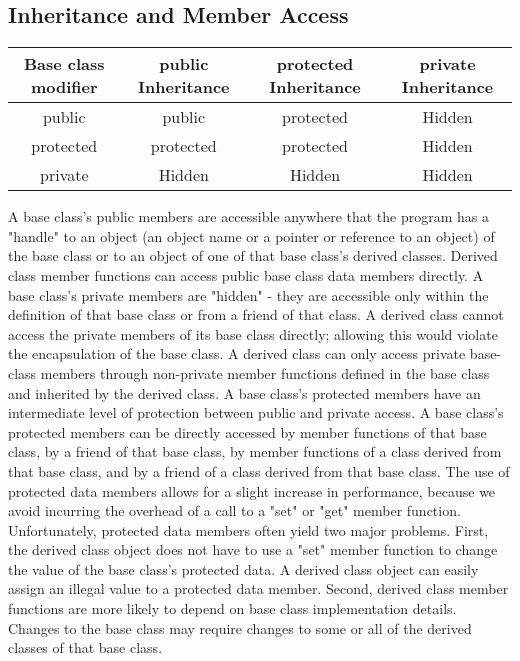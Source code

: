 \documentclass{report}
\begin{document}
    \subsection{Inheritance and Member Access}
    \bigbreak \noindent 
    \begin{center}
        \begin{tabular}{c|c|c|c}
            Base class modifier	& public Inheritance	& protected Inheritance	& private Inheritance \\
            \hline
            public	&public 	&protected 	&Hidden  \\
            protected &	protected 	&protected 	&Hidden  \\
            private	&Hidden 	&Hidden 	&Hidden 
        \end{tabular}

    \end{center}
    \bigbreak \noindent 
    A base class's public members are accessible anywhere that the program has a "handle" to an object (an object name or a pointer or reference to an object) of the base class or to an object of one of that base class's derived classes. Derived class member functions can access public base class data members directly.
    \bigbreak \noindent 
    A base class's private members are "hidden" - they are accessible only within the definition of that base class or from a friend of that class. A derived class cannot access the private members of its base class directly; allowing this would violate the encapsulation of the base class. A derived class can only access private base-class members through non-private member functions defined in the base class and inherited by the derived class.
    \bigbreak \noindent 
    A base class's protected members have an intermediate level of protection between public and private access. A base class's protected members can be directly accessed by member functions of that base class, by a friend of that base class, by member functions of a class derived from that base class, and by a friend of a class derived from that base class.
    \bigbreak \noindent 
    The use of protected data members allows for a slight increase in performance, because we avoid incurring the overhead of a call to a "set" or "get" member function. Unfortunately, protected data members often yield two major problems. First, the derived class object does not have to use a "set" member function to change the value of the base class's protected data. A derived class object can easily assign an illegal value to a protected data member. Second, derived class member functions are more likely to depend on base class implementation details. Changes to the base class may require changes to some or all of the derived classes of that base class.
\end{document}
